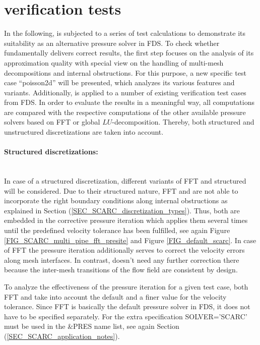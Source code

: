 \section{\scarc{} verification tests}
\label{SEC_SCARC_verification}

In the following, \scarc{} is subjected to a series of test calculations to demonstrate its suitability as an alternative pressure solver in FDS.  To check whether \scarc{} fundamentally delivers correct results, 
the first step focuses on the analysis of its approximation quality with special view on the handling of multi-mesh decompositions and internal obstructions.
%
For this purpose, a new \scarc{} specific test case ``poisson2d'' will be presented, which analyzes its various features and variants.
Additionally, \scarc{} is applied to a number of existing verification test cases from FDS.
In order to evaluate the results in a meaningful way, all \scarc{} computations are compared with the respective computations of the other available pressure solvers based on FFT or global $LU$-decomposition. Thereby, both structured and unstructured discretizations are taken into account. 

%
\paragraph{Structured discretizations:} \mbox{} \\[1ex]
In case of a structured discretization, different variants of FFT and structured \scarc{} will be considered.
Due to their structured nature, FFT and \scarc{} are not able to incorporate the right boundary conditions along internal obstructions 
as explained in Section (\ref{SEC_SCARC_discretization_types}). 
Thus, both are embedded in the corrective pressure iteration which applies them several times until the predefined velocity tolerance has been fulfilled, see again Figure \ref{FIG_SCARC_multi_pipe_fft_presite} and Figure \ref{FIG_default_scarc}.
In case of FFT the pressure iteration additionally serves to correct the velocity errors along mesh interfaces. In contrast, \scarc{} doesn't need any further correction there because the inter-mesh transitions of the flow field are consistent by design. 

To analyze the effectiveness of the pressure iteration for a given test case, both FFT and \scarc{} take into account the default and a finer value for the velocity tolerance. Since FFT is basically the default pressure solver in FDS, it does not have to be specified separately.
For \scarc{} the extra specification {\ct SOLVER='SCARC'} must be used in the {\ct \&PRES} name list, see
again Section (\ref{SEC_SCARC_application_notes}).


